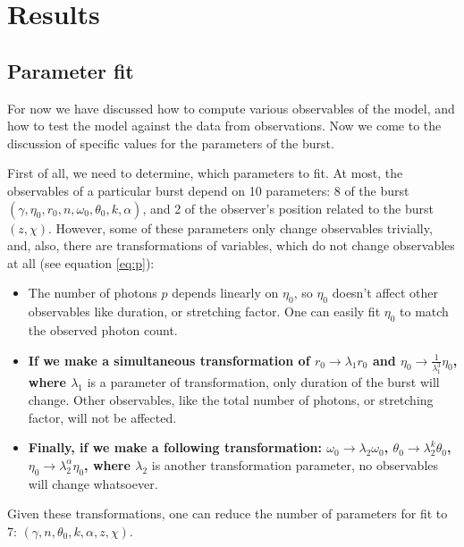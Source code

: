 \documentclass[manuscript]{aastex}
\begin{document}
\section{Results}
\label{sec:results}

\subsection{Parameter fit}
\label{sec:parameters}

For now we have discussed how to compute various observables of the model,
and how to test the model against the data from observations. Now we
come to the discussion of specific values for the parameters of the
burst.

First of all, we need to determine, which parameters to fit. At most,
the observables of a particular burst depend on 10 parameters: 8 of
the burst $\left(\gamma, \eta_0, r_0, n, \omega_0, \theta_0, k,
\alpha\right)$, and 2 of the observer's position related to the burst
$\left(z, \chi\right)$. However, some of these parameters only change
observables trivially, and, also, there are transformations of
variables, which do not change observables at all (see equation
\ref{eq:p}):
\begin{itemize}
	\item{The number of photons $p$ depends linearly on $\eta_0$,
          so $\eta_0$ doesn't affect other observables like duration,
          or stretching factor. One can easily fit $\eta_0$ to match
          the observed photon count.}
	\item{{\bf If we make a simultaneous transformation of $r_0
          \rightarrow \lambda_1 r_0$ and $\eta_0 \rightarrow
          \frac{1}{\lambda_1^3}\eta_0$, where $\lambda_1$} is a parameter
          of transformation, only duration of the burst will
          change. Other observables, like the total number of photons,
          or stretching factor, will not be affected.}
	\item{{\bf Finally, if we make a following transformation:
          $\omega_0 \rightarrow \lambda_2 \omega_0$, $\theta_0
          \rightarrow \lambda_2^k \theta_0$, $\eta_0 \rightarrow
          \lambda_2^\alpha \eta_0$, where $\lambda_2$ } is another
          transformation parameter, no observables will change
          whatsoever.}
\end{itemize}
Given these transformations, one can reduce the number of parameters
for fit to 7: $\left(\gamma, n, \theta_0, k, \alpha, z, \chi\right)$.
\end{document}
